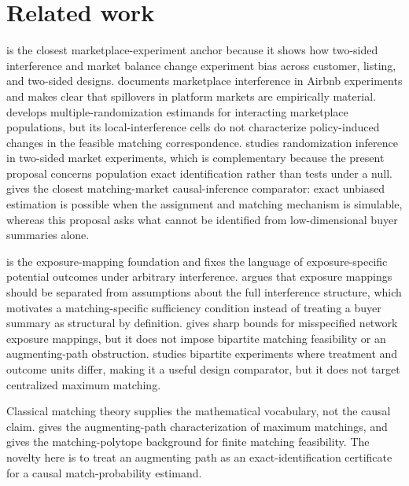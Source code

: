 \documentclass[11pt]{article}
\theoremstyle{definition}
\theoremstyle{plain}
\theoremstyle{remark}
\begin{document}
\section{Related work}
\citet{JohariLiLiskovichWeintraub2022} is the closest marketplace-experiment anchor because it shows how two-sided interference and market balance change experiment bias across customer, listing, and two-sided designs.  \citet{HoltzFelipeLobelLobelLiskovichAral2024} documents marketplace interference in Airbnb experiments and makes clear that spillovers in platform markets are empirically material.  \citet{MasoeroVijaykumarRichardsonMcQueenRosenBurdickBajariImbens2026} develops multiple-randomization estimands for interacting marketplace populations, but its local-interference cells do not characterize policy-induced changes in the feasible matching correspondence.  \citet{LiuShaikhToulis2025} studies randomization inference in two-sided market experiments, which is complementary because the present proposal concerns population exact identification rather than tests under a null.  \citet{Chen2019} gives the closest matching-market causal-inference comparator: exact unbiased estimation is possible when the assignment and matching mechanism is simulable, whereas this proposal asks what cannot be identified from low-dimensional buyer summaries alone.

\citet{AronowSamii2017} is the exposure-mapping foundation and fixes the language of exposure-specific potential outcomes under arbitrary interference.  \citet{Savje2024} argues that exposure mappings should be separated from assumptions about the full interference structure, which motivates a matching-specific sufficiency condition instead of treating a buyer summary as structural by definition.  \citet{SchroderOprescuFeuerriegelKallus2026} gives sharp bounds for misspecified network exposure mappings, but it does not impose bipartite matching feasibility or an augmenting-path obstruction.  \citet{DoudchenkoZhangDrynkinAiroldiMirrokniPougetAbadie2020} studies bipartite experiments where treatment and outcome units differ, making it a useful design comparator, but it does not target centralized maximum matching.

Classical matching theory supplies the mathematical vocabulary, not the causal claim.  \citet{Berge1957} gives the augmenting-path characterization of maximum matchings, and \citet{Edmonds1965} gives the matching-polytope background for finite matching feasibility.  The novelty here is to treat an augmenting path as an exact-identification certificate for a causal match-probability estimand.
\end{document}
